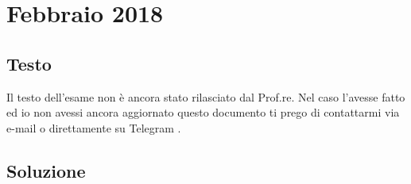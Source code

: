 \section{Febbraio 2018}

\subsection*{Testo}

Il testo dell'esame non è ancora stato rilasciato dal Prof.re. %
{\color{burgundy} Nel caso l'avesse fatto ed io non avessi ancora aggiornato questo documento ti prego di contattarmi via e-mail \href{mailto:emanuele.nardi@studenti.unitn.it}{\ExternalLink} o direttamente su Telegram \href{https://t.me/emanuelenardi}{\ExternalLink}.}

\subsection*{Soluzione}

